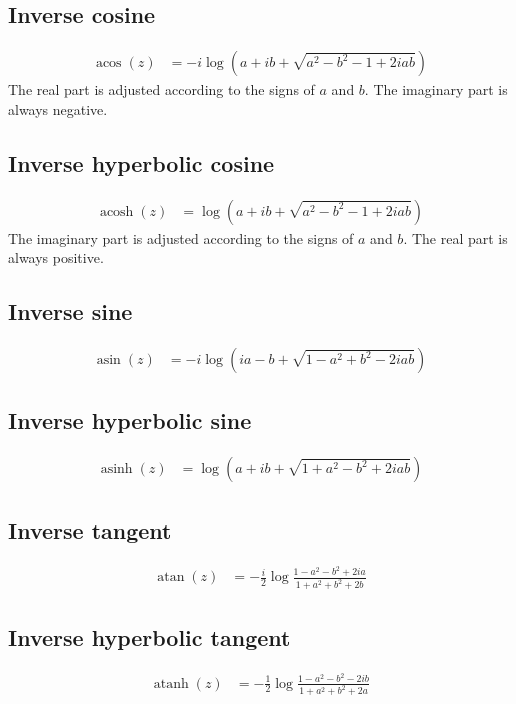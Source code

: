 \documentclass[11pt,a4paper,twoside]{article}
\DeclareMathOperator{\acos}{acos}
\DeclareMathOperator{\acosh}{acosh}
\DeclareMathOperator{\asin}{asin}
\DeclareMathOperator{\asinh}{asinh}
\DeclareMathOperator{\atan}{atan}
\DeclareMathOperator{\atanh}{atanh}
\begin{document}
\subsection{Inverse cosine}
\begin{align}
	\acos{(z)}	& = -i\log{\left(a + ib + \sqrt{a^2 - b^2 - 1 + 2iab}\right)}
\end{align}
The real part is adjusted according to the signs of $a$ and $b$.
The imaginary part is always negative.

\subsection{Inverse hyperbolic cosine}
\begin{align}
	\acosh{(z)}	& = \log{\left(a + ib + \sqrt{a^2 - b^2 - 1 + 2iab}\right)}
\end{align}
The imaginary part is adjusted according to the signs of $a$ and $b$.
The real part is always positive.

\subsection{Inverse sine}
\begin{align}
	\asin{(z)}	& = -i\log{\left(ia - b + \sqrt{1 - a^2 + b^2 - 2iab}\right)}
\end{align}

\subsection{Inverse hyperbolic sine}
\begin{align}
	\asinh{(z)}	& = \log{\left(a + ib + \sqrt{1 + a^2 - b^2 + 2iab}\right)}
\end{align}

\subsection{Inverse tangent}
\begin{align}
	\atan{(z)}	& = -\frac{i}{2}\log{\frac{1 - a^2 - b^2 + 2ia}{1 + a^2 + b^2 + 2b}}
\end{align}

\subsection{Inverse hyperbolic tangent}
\begin{align}
	\atanh{(z)}	& = -\frac{1}{2}\log{\frac{1 - a^2 - b^2 - 2ib}{1 + a^2 + b^2 + 2a}}
\end{align}
\end{document}
